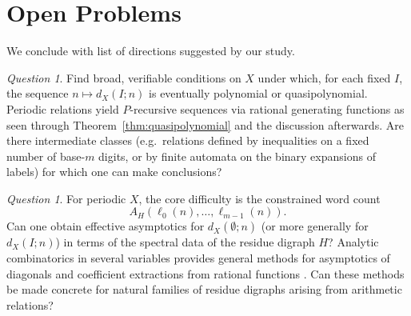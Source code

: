 \documentclass[12pt]{amsart}
\theoremstyle{definition}
\theoremstyle{remark}
\newtheorem{question}[theorem]{Question}
\newcommand{\N}{\mathbb{N}}
\newcommand{\abs}[1]{\left|#1\right|}
\begin{document}
%
\section{Open Problems}\label{sec:open}

We conclude with list of directions suggested by our study.


\begin{question}Find broad, verifiable conditions on $X$ under which, for each fixed $I$, the sequence $n\mapsto d_X(I;n)$ is
eventually polynomial or quasipolynomial.
Periodic relations yield $P$-recursive sequences via rational generating functions as seen through Theorem~\ref{thm:quasipolynomial} and the discussion afterwards. Are there intermediate classes (e.g.\ relations defined by inequalities on a fixed number of base-$m$ digits, or by
finite automata on the binary expansions of labels) for which one can make conclusions?
\end{question}

\begin{question}For periodic $X$, the core difficulty is the constrained word count 
\[
A_H(\ell_0(n),\dots,\ell_{m-1}(n)).
\]
Can one obtain effective asymptotics for $d_X(\emptyset;n)$ (or more generally for $d_X(I;n)$) in terms of the
spectral data of the residue digraph $H$?
Analytic combinatorics in several variables provides general methods for asymptotics of diagonals and coefficient
extractions from rational functions \cite{pemantle-wilson,flajolet-sedgewick}.
Can these methods be made concrete for natural families of residue digraphs arising from arithmetic relations?
\end{question}
\end{document}
